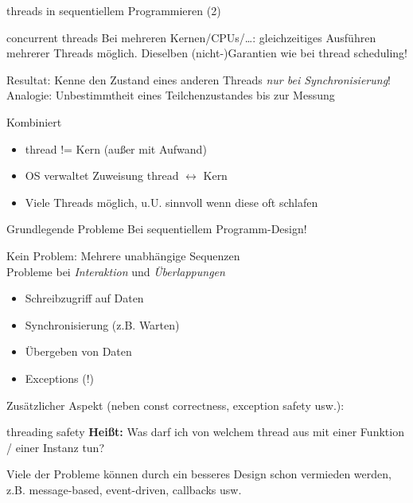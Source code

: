 \begin{frame}{threads in sequentiellem Programmieren (2)}
	\begin{block}{concurrent threads}
		Bei mehreren Kernen/CPUs/\dots: gleichzeitiges Ausführen mehrerer Threads möglich.
		Dieselben (nicht-)Garantien wie bei thread scheduling!
	\end{block}
	
	Resultat: Kenne den Zustand eines anderen Threads \emph{nur bei Synchronisierung}!\\
	Analogie: Unbestimmtheit eines Teilchenzustandes bis zur Messung
	
	\pause
	\vspace{1em}
	
	\begin{block}{Kombiniert}
		\begin{itemize}
			\item thread != Kern (außer mit Aufwand)
			\item OS verwaltet Zuweisung thread $\leftrightarrow$ Kern
			\item Viele Threads möglich, u.U. sinnvoll wenn diese oft schlafen
		\end{itemize}
	\end{block}
\end{frame}

\begin{frame}{Grundlegende Probleme}
	Bei sequentiellem Programm-Design!
	
	\vspace{0.5em}
	
	Kein Problem: Mehrere unabhängige Sequenzen\\
	Probleme bei \emph{Interaktion} und \emph{Überlappungen}
	\begin{itemize}
		\item Schreibzugriff auf Daten
		\item Synchronisierung (z.B. Warten)
		\item Übergeben von Daten
		\item Exceptions (!)
	\end{itemize}
	
	\vspace{0.5em}
	
	Zusätzlicher Aspekt (neben const correctness, exception safety usw.):
	\begin{block}{threading safety}
		\textbf{Heißt:} Was darf ich von welchem thread aus mit einer Funktion / einer Instanz tun?
	\end{block}
	
	\pause
	
	\alert{Viele der Probleme können durch ein besseres Design schon vermieden werden, z.B. message-based, event-driven, callbacks usw.}
\end{frame}


